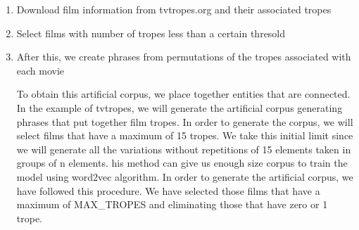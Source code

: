 \documentclass[letterpaper]{article}
\begin{document}
	\begin{enumerate}
		\item Download film information from tvtropes.org and their associated tropes
		\item Select films with number of tropes less than a certain thresold
		\item After this, we create phrases from permutations of the tropes associated with each movie


	
	

	To obtain this artificial corpus, we place together entities
	that are connected. In the example of tvtropes, we will
	generate the artificial corpus generating phrases that put
	together film tropes. In order to generate the corpus, we will
	select films that have a maximum of 15 tropes. We take this
	initial limit since we will generate all the variations
	without repetitions of 15 elements taken in groups of n
	elements. his method can give us enough size corpus to train
	the model using word2vec algorithm.
	In order to generate the artificial corpus, we have followed this procedure. We have selected those films that have a maximum of MAX\_TROPES and eliminating those that have zero or 1 trope.   
	
	\end{enumerate}
		
\end{document}

